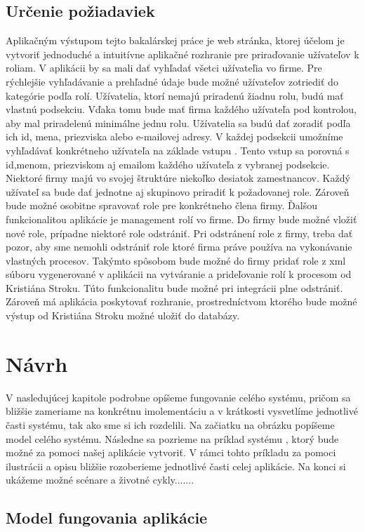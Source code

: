 \subsection{Určenie požiadaviek}
Aplikačným výstupom tejto bakalárskej práce je web stránka, ktorej účelom je vytvoriť jednoduché a intuitívne aplikačné rozhranie pre priraďovanie užívateľov k roliam. V aplikácii by sa mali dať vyhľadať všetci užívateľia vo firme. Pre rýchlejšie vyhľadávanie a prehľadné údaje bude možné užívateľov zotriediť do kategórie podľa rolí. Užívatelia, ktorí nemajú priradenú žiadnu rolu, budú mať vlastnú podsekciu. Vďaka tomu bude mať firma každého užívateľa pod kontrolou, aby mal priradelenú minimálne jednu rolu. Užívatelia sa budú dať zoradiť podľa ich id, mena, priezviska alebo e-mailovej adresy. V každej podsekcii umožníme vyhľadávať konkrétneho užívateľa na základe vstupu . Tento vstup sa porovná s id,menom, priezviskom aj emailom každého užívateľa z vybranej podsekcie. Niektoré firmy majú vo svojej štruktúre niekoľko desiatok zamestnancov.   Každý užívateľ sa bude dať jednotne aj skupinovo priradiť k požadovanej role. Zároveň bude možné osobitne spravovať role pre konkrétneho člena firmy. Ďalšou funkcionalitou aplikácie je management rolí vo firme. Do firmy bude možné vložiť nové role, prípadne niektoré role odstrániť. Pri odstránení role z firmy, treba dať pozor, aby sme nemohli odstrániť role ktoré firma práve používa na vykonávanie vlastných procesov. Takýmto spôsobom bude možné do firmy pridať role z xml súboru vygenerované v aplikácii na vytváranie a prideľovanie rolí k procesom od Kristiána Stroku. Túto funkcionalitu bude možné pri integrácii plne odstrániť. Zároveň má aplikácia poskytovať rozhranie, prostredníctvom ktorého  bude možné výstup od Kristiána Stroku možné uložiť do databázy. 

\section{Návrh}
V nasledujúcej kapitole podrobne opíšeme fungovanie celého systému, pričom sa bližšie zameriame na konkrétnu imolementáciu a v krátkosti vysvetlíme jednotlivé časti systému, tak ako sme si ich rozdelili. Na začiatku na obrázku popíšeme model celého systému. Následne sa pozrieme na príklad systému , ktorý bude možné za pomoci našej aplikácie vytvoriť. V rámci tohto príkladu za pomoci ilustrácii a opisu bližšie rozoberieme jednotlivé časti celej aplikácie. Na konci si ukážeme možné scénare a životné cykly.......
	
	\subsection{Model fungovania aplikácie}
		
